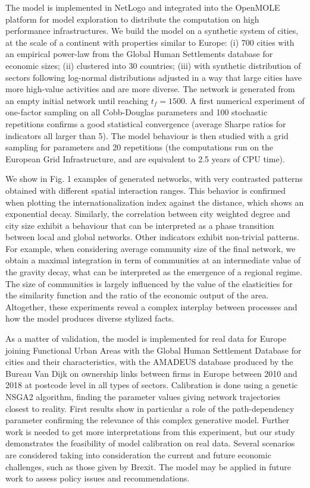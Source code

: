 \documentclass[10pt,letterpaper]{article}
\begin{document}
The model is implemented in NetLogo and integrated into the OpenMOLE platform for model exploration to distribute the computation on high performance infrastructures. We build the model on a synthetic system of cities, at the scale of a continent with properties similar to Europe: (i) 700 cities with an empirical power-law from the Global Human Settlements database for economic sizes; (ii) clustered into 30 countries; (iii) with synthetic distribution of sectors following log-normal distributions adjusted in a way that large cities have more high-value activities and are more diverse. The network is generated from an empty initial network until reaching $t_f=1500$. A first numerical experiment of one-factor sampling on all Cobb-Douglas parameters and 100 stochastic repetitions confirms a good statistical convergence (average Sharpe ratios for indicators all larger than 5). The model behaviour is then studied with a grid sampling for parameters and 20 repetitions (the computations run on the European Grid Infrastructure, and are equivalent to 2.5 years of CPU time).

We show in Fig. 1 examples of generated networks, with very contrasted patterns obtained with different spatial interaction ranges. This behavior is confirmed when plotting the internationalization index against the distance, which shows an exponential decay. Similarly, the correlation between city weighted degree and city size exhibit a behaviour that can be interpreted as a phase transition between local and global networks. Other indicators exhibit non-trivial patterns. For example, when considering average community size of the final network, we obtain a maximal integration in term of communities at an intermediate value of the gravity decay, what can be interpreted as the emergence of a regional regime. The size of communities is largely influenced by the value of the elasticities for the similarity function and the ratio of the economic output of the area. Altogether, these experiments reveal a complex interplay between processes and how the model produces diverse stylized facts.

As a matter of validation, the model is implemented for real data for Europe joining Functional Urban Areas with the Global Human Settlement Database for cities and their characteristics, with the AMADEUS database produced by the Bureau Van Dijk on ownership links between firms in Europe between 2010 and 2018 at postcode level in all types of sectors. Calibration is done using a genetic NSGA2 algorithm, finding the parameter values giving network trajectories closest to reality. First results show in particular a role of the path-dependency parameter confirming the relevance of this complex generative model. Further work is needed to get more interpretations from this experiment, but our study demonstrates the feasibility of model calibration on real data. Several scenarios are considered taking into consideration the current and future economic challenges, such as those given by Brexit. The model may be applied in future work to assess policy issues and recommendations.
\end{document}
